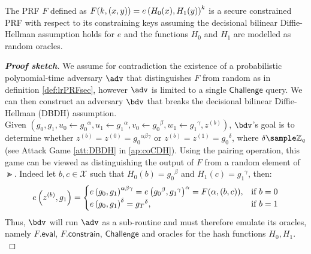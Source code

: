 		\begin{theorem}
			The PRF $F$ defined as $F(k, (x,y)) = e\left(H_0(x), H_1(y) \right)^k$ is a secure constrained PRF with respect to its constraining keys assuming the decisional bilinear Diffie-Hellman assumption holds for $e$ and the functions $H_0$ and $H_1$ are modelled as random oracles.
		\end{theorem}
		
		\begin{proof}[\textbf{Proof sketch}]
			We assume for contradiction the existence of a probabilistic polynomial-time adversary $\adv$ that distinguishes $F$ from random as in definition \autoref{def:lrPRFsec}, however $\adv$ is limited to a single $\mathsf{Challenge}$ query. We can then construct an adversary $\bdv$ that breaks the decisional bilinear Diffie-Hellman (DBDH) assumption.\\
			
			Given $(g_0, g_1, u_0 \leftarrow {g_0}^\alpha, u_1 \leftarrow {g_1}^\alpha, v_0 \leftarrow {g_0}^\beta, w_1 \leftarrow {g_1}^\gamma, z^{(b)})$, $\bdv$'s goal is to determine whether $z^{(b)} = z^{(0)} = {g_0}^{\alpha\beta\gamma}$ or $z
			^{(b)} = z^{(1)} = {g_0}^\delta$, where $\delta \sample \mathbb{Z}_q$ (see Attack Game \autoref{att:DBDH} in \autoref{ap:coCDH}). Using the pairing operation, this game can be viewed as distinguishing the output of $F$ from a random element of $\Gt$. Indeed let $b,c \in \mathcal{X}$ such that $H_0(b) = {g_0}^\beta$ and $H_1(c) = {g_1}^\gamma$, then:
			\begin{equation}
				e\left(z^{(b)}, g_1 \right) =
				\begin{cases} e\left(g_0, g_1 \right)^{\alpha\beta\gamma} = e\left({g_0}^\beta, {g_1}^\gamma \right)^\alpha =  F(\alpha, (b, c)), & \text{if } b=0 \\
				 e\left(g_0, g_1 \right)^\delta	= {g_T}^\delta, & \text{if } b=1
				\end{cases}
			\end{equation}
			Thus, $\bdv$ will run $\adv$ as a sub-routine and must therefore emulate its oracles, namely $F.\mathsf{eval}$, $F.\mathsf{constrain}$, $\mathsf{Challenge}$ and oracles for the hash functions $H_0,H_1$. \\
			

\end{proof}
